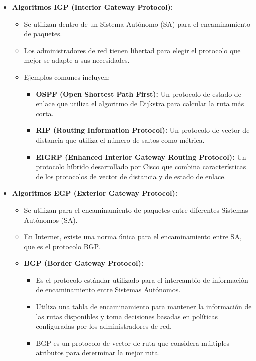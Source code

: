 \documentclass[a4paper,12pt]{article}
\begin{document}
\begin{itemize}
    \item \textbf{Algoritmos IGP (Interior Gateway Protocol):}
        \begin{itemize}
            \item Se utilizan dentro de un Sistema Autónomo (SA) para el encaminamiento de paquetes.
            \item Los administradores de red tienen libertad para elegir el protocolo que mejor se adapte a sus necesidades.
            \item Ejemplos comunes incluyen:
                \begin{itemize}
                    \item \textbf{OSPF (Open Shortest Path First):} Un protocolo de estado de enlace que utiliza el algoritmo de Dijkstra para calcular la ruta más corta.
                    \item \textbf{RIP (Routing Information Protocol):} Un protocolo de vector de distancia que utiliza el número de saltos como métrica.
                    \item \textbf{EIGRP (Enhanced Interior Gateway Routing Protocol):} Un protocolo híbrido desarrollado por Cisco que combina características de los protocolos de vector de distancia y de estado de enlace.
                \end{itemize}
        \end{itemize}

    \item \textbf{Algoritmos EGP (Exterior Gateway Protocol):}
        \begin{itemize}
            \item Se utilizan para el encaminamiento de paquetes entre diferentes Sistemas Autónomos (SA).
            \item En Internet, existe una norma única para el encaminamiento entre SA, que es el protocolo BGP.
            \item \textbf{BGP (Border Gateway Protocol):} 
                \begin{itemize}
                    \item Es el protocolo estándar utilizado para el intercambio de información de encaminamiento entre Sistemas Autónomos.
                    \item Utiliza una tabla de encaminamiento para mantener la información de las rutas disponibles y toma decisiones basadas en políticas configuradas por los administradores de red.
                    \item BGP es un protocolo de vector de ruta que considera múltiples atributos para determinar la mejor ruta.
                \end{itemize}
        \end{itemize}
\end{itemize}
\end{document}
